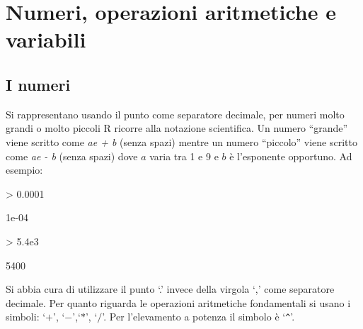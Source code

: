 \documentclass[onecolumn,11pt]{book}
\newcommand{\varia}[1]{\textsl{\textsf{#1}}}
\begin{document}
\section{Numeri, operazioni aritmetiche e variabili}
\subsection{I numeri}
Si rappresentano usando il punto come separatore decimale, per numeri molto grandi o molto piccoli \textsf{R} ricorre alla notazione scientifica. Un numero  ``grande''  viene scritto come
\varia{ae + b} (senza spazi) mentre un numero  ``piccolo'' viene scritto come
\varia{ae - b} (senza spazi) 
dove $a$ varia tra 1 e 9 e $b$  \`e l'esponente opportuno. Ad esempio:
\begin{Schunk}
\begin{Sinput}
> 0.0001
\end{Sinput}
\begin{Soutput}
[1] 1e-04
\end{Soutput}
\begin{Sinput}
> 5.4e3
\end{Sinput}
\begin{Soutput}
[1] 5400
\end{Soutput}
\end{Schunk}
Si abbia cura di utilizzare il punto `.' invece della virgola `,'  come separatore decimale.  
Per quanto riguarda le operazioni aritmetiche fondamentali si usano i simboli:
`$+$', `$-$',`$*$', `$/$'. Per l'elevamento a potenza il simbolo  \`e `\texttt{\^}'.
\end{document}
